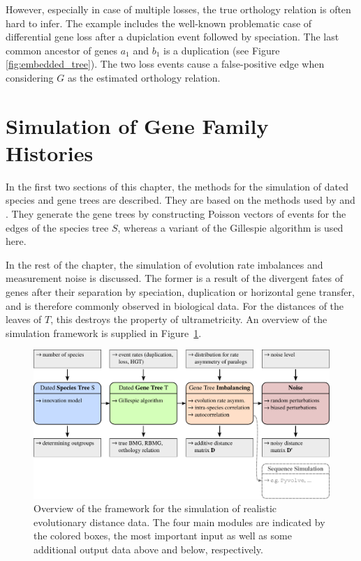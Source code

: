 \documentclass[hidelinks,11pt]{scrreprt}
\begin{document}
However, especially in case of multiple losses, the true orthology relation is often hard to infer. The example includes the well-known problematic case of differential gene loss after a dupiclation event followed by speciation. The last common ancestor of genes $a_1$ and $b_1$ is a duplication (see Figure \ref{fig:embedded_tree}). The two loss events cause a false-positive edge when considering $G$ as the estimated orthology relation.

\section{Simulation of Gene Family Histories}
\label{sec:simulation}

In the first two sections of this chapter, the methods for the simulation of dated species and gene trees are described. They are based on the methods used by \citet{hernandez-rosales2014} and \citet{lopezsanchez2019}. They generate the gene trees by constructing Poisson vectors of events for the edges of the species tree $S$, whereas a variant of the Gillespie algorithm \citep{gillespie1976} is used here.

In the rest of the chapter, the simulation of evolution rate imbalances and measurement noise is discussed. The former is a result of the divergent fates of genes after their separation by speciation, duplication or horizontal gene transfer, and is therefore commonly observed in biological data. For the distances of the leaves of $T$, this destroys the property of ultrametricity. An overview of the simulation framework is supplied in Figure~\ref{fig:simulation_framework}.

\vspace{5mm}
\begin{figure}[ht]
	\begin{center}     
		\includegraphics[width=\columnwidth]{simulation_framework.pdf}
	\end{center}
	\caption[Overview of the framework for the simulation of realistic evolutionary distance data]{Overview of the framework for the simulation of realistic evolutionary distance data. The four main modules are indicated by the colored boxes, the most important input as well as some additional output data above and below, respectively.}
	\label{fig:simulation_framework}
\end{figure}
\end{document}
